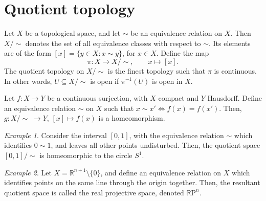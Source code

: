 \documentclass[11pt]{article}
\newcommand{\R}{\mathbb{R}}
\newcommand{\RP}{\R\mathrm{P}}
\theoremstyle{definition}
\theoremstyle{remark}
\newtheorem*{example}{Example}
\numberwithin{equation}{section}
\begin{document}
    \section{Quotient topology}
    
    \begin{definition}
        Let $X$ be a topological space, and let $\sim$ be an equivalence relation on
        $X$. Then $X/\sim$ denotes the set of all equivalence classes with respect to
        $\sim$. Its elements are of the form $[x] = \{y \in X : x \sim y\}$, for $x
        \in X$. Define the map \[
            \pi\colon X \to X/\sim, \qquad x \mapsto [x].
        \] The quotient topology on $X/\sim$ is the finest topology such that $\pi$
        is continuous. In other words, $U \subseteq X/\sim$ is open if $\pi^{-1}(U)$
        is open in $X$.
    \end{definition}

    \begin{lemma}
        Let $f\colon X \to Y$ be a continuous surjection, with $X$ compact and $Y$
        Hausdorff. Define an equivalence relation $\sim$ on $X$ such that $x\sim
        x'\Leftrightarrow f(x) = f(x')$. Then, $g\colon X/\sim \;\to Y$, $[x] \mapsto f(x)$ is a
        homeomorphism.
    \end{lemma}
    \begin{example}
        Consider the interval $[0, 1]$, with the equivalence relation $\sim$ which
        identifies $0 \sim 1$, and leaves all other points undisturbed. Then, the
        quotient space $[0, 1]/\sim$ is homeomorphic to the circle $S^1$.
    \end{example}
    \begin{example}
        Let $X = \R^{n + 1}\setminus\{0\}$, and define an equivalence relation on $X$
        which identifies points on the same line through the origin together. Then,
        the resultant quotient space is called the real projective space, denoted
        $\RP^n$.
    \end{example}
\end{document}
